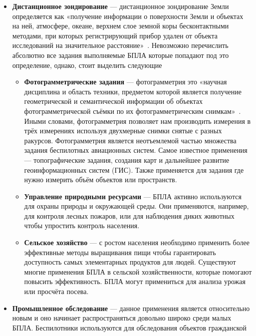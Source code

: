 \documentclass[specification,annotation]{itmo-student-thesis}
\begin{document}
\begin{itemize}
  \item \textbf{Дистанционное зондирование} --- дистанционное зондирование Земли
    определяется как «получение информации о поверхности Земли и объектах на
    ней, атмосфере, океане, верхнем слое земной коры бесконтактными методами,
    при которых регистрирующий прибор удален от объекта исследований на
    значительное расстояние»~\cite{lomonosov-remote-sensing}. Невозможно
    перечислить абсолютно все задания выполняемые БПЛА которые попадают под это
    определение, однако, стоит выделить следующие
    \begin{itemize}
      \item \textbf{Фотограмметрические задания} --- фотограмметрия это «научная
        дисциплина и область техники, предметом которой является получение
        геометрической и семантической информации об объектах
        фотограмметрической съёмки по их фотограмметрическим
        снимкам»~\cite{gost-photogrammetry}. Иными словами, фотограмметрия
        позволяет нам производить измерения в трёх измерениях используя
        двухмерные снимки снятые с разных ракурсов. Фотограмметрия является
        неотъемлемой частью множества задания беспилотных авиационных систем.
        Самое известное применения --- топографические задания, создания карт
        и дальнейшее развитие геоинформационных систем (ГИС). Также применяется
        для задания где нужно измерить объём объектов или пространств.
      \item \textbf{Управление природными ресурсами} --- БПЛА активно
        используются для охраны природы и окружающей среды. Они применяются,
        например, для контроля лесных пожаров, или для наблюдения диких животных
        чтобы упростить контроль населения.
      \item \textbf{Сельское хозяйство} --- с ростом населения необходимо
        применить более эффективные методы выращивания пищи чтобы гарантировать
        доступность самых элементарных продуктов для людей. Существуют многие
        применения БПЛА в сельской хозяйственности, которые помогают повысить
        эффективность. БПЛА могут примениться для анализа урожая или просчёта
        посева.
    \end{itemize}
  \item \textbf{Промышленное обследование} --- данное применения является
    относительно новым и оно начинает распространяться довольно широко среди
    малых БПЛА. Беспилотники используются для обследования объектов гражданской

\end{itemize}
\end{document}
